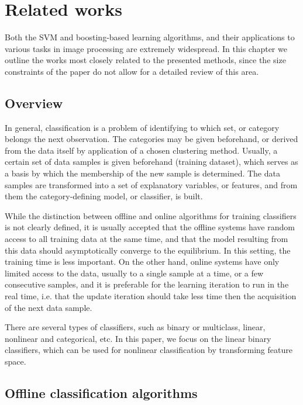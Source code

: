 \ifpdf
    \graphicspath{{2/figures/PNG/}{2/figures/PDF/}{2/figures/}}
\else
    \graphicspath{{2/figures/EPS/}{2/figures/}}
\fi
\chapter{Related works} %
\label{Chap2}
Both the SVM and boosting-based learning algorithms, and their applications to various tasks in image processing are extremely widespread. In this chapter we outline the works most closely related to the presented methods, since the size constraints of the paper do not allow for a detailed review of this area. 
\section{Overview}
In general, classification is a problem of identifying to which set, or category belongs the next observation. The categories may be given beforehand, or derived from the data itself by application of a chosen clustering method. Usually, a certain set of data samples is given beforehand (training dataset), which serves as a basis by which the membership of the new sample is determined. The data samples are transformed into a set of explanatory variables, or features, and from them the category-defining model, or classifier, is built.

While the distinction between offline and online algorithms for training classifiers is not clearly defined, it is usually accepted that the offline systems have random access to all training data at the same time, and that the model resulting from this data should asymptotically converge to the equilibrium. In this setting, the training time is less important.  On the other hand, online systems have only limited access to the data, usually to a single sample at a time, or a few consecutive samples, and it is preferable for the learning iteration to run in the real time, i.e. that the update iteration should take less time then the acquisition of the next data sample. 

There are several types of classifiers, such as binary or multiclass, linear, nonlinear and categorical, etc. In this paper, we focus on the linear binary classifiers, which can be used for nonlinear classification by transforming feature space. 
\section{Offline classification algorithms}

